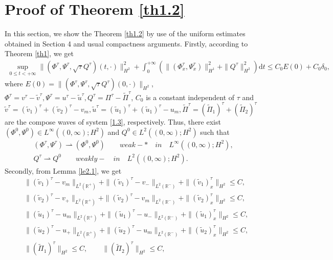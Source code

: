 \documentclass[10pt,reqno]{amsart}
\numberwithin{equation}{section}
\newcommand{\dif}{\mathrm{d}}
\begin{document}
\section{Proof of Theorem \ref{th1.2}}
In this section, we show the Theorem \ref{th1.2} by use of the uniform estimates obtained in Section 4 and usual compactness arguments.
Firstly,  according to Theorem \ref{th1}, we get
\begin{align*}
\sup_{0\le t<+\infty}\|(\Phi^{\tau}, \Psi^{\tau}, \sqrt{\tau}Q^{\tau}) (t,\cdot)\|_{H^2}^2+\int_0^{+\infty}\left(\|(\Phi^{\tau}_{x}, \Psi^{\tau}_{x})\|_{H^1}^2+\|Q^{\tau}\|_{H^2}^2\right)\dif t
\le C_0E(0)+C_0\delta_0,
\end{align*}
where $
E(0)=\|(\Phi^\tau,\Psi^\tau,\sqrt{\tau}Q^\tau)(0, \cdot)\|_{H^2}$, $\Phi^{\tau}=v^{\tau}-\widetilde v^{\tau}, \Psi^{\tau}=u^{\tau}-\widetilde u^{\tau}, Q^{\tau}=\Pi^{\tau}-\widetilde \Pi^{\tau}$, $C_0$ is a constant independent of $\tau$ and $\widetilde v^{\tau}=(\widetilde v_1)^{\tau}+(\widetilde v_2)^{\tau}-v_m, \widetilde u^{\tau}=(\widetilde u_1)^{\tau}+(\widetilde u_1)^{\tau}-u_m, \widetilde \Pi^{\tau}=(\widetilde \Pi_1)^{\tau}+(\widetilde \Pi_2)^{\tau}$ are the compose waves of system \eqref{1.3}, respectively. Thus, there exist $(\Phi^0, \Psi^0)\in L^{\infty}((0,\infty);H^2)$ and $Q^0\in L^2((0, \infty);H^2)$ such that
\begin{equation}\label{5.1}
\begin{aligned}
(\Phi^{\tau}, \Psi^{\tau})\rightharpoonup(\Phi^0, \Psi^0)\qquad weak-* \quad in \quad L^{\infty}((0,\infty);H^2),\\
Q^{\tau}\rightharpoonup Q^0 \qquad weakly- \quad in \quad  L^2((0, \infty);H^2).
\end{aligned}
\end{equation}
Secondly, from Lemma \ref{le2.1}, we get
\[
\begin{aligned}
&\|(\widetilde v_1)^{\tau}-v_m\|_{L^2(\mathbb{R}^+)}+\|(\widetilde v_1)^{\tau}-v_-\|_{L^2(\mathbb{R}^-)}
+\|(\widetilde v_1)^{\tau}_{x}\|_{H^2}\le C,\\
&\|(\widetilde v_2)^{\tau}-v_+\|_{L^2(\mathbb{R}^+)}+\|(\widetilde v_2)^{\tau}-v_m\|_{L^2(\mathbb{R}^-)}
+\|(\widetilde v_2)^{\tau}_{x}\|_{H^2}\le C,\\
&\|(\widetilde u_1)^{\tau}-u_m\|_{L^2(\mathbb{R}^+)}+\|(\widetilde u_1)^{\tau}-u_-\|_{L^2(\mathbb{R}^-)}
+\|(\widetilde u_1)^{\tau}_{x}\|_{H^2}\le C,\\
&\|(\widetilde u_2)^{\tau}-u_+\|_{L^2(\mathbb{R}^+)}+\|(\widetilde u_2)^{\tau}-u_m\|_{L^2(\mathbb{R}^-)}
+\|(\widetilde u_2)^{\tau}_{x}\|_{H^2}\le C,\\
&\|(\widetilde \Pi_1)^{\tau}\|_{H^2}\le C,\qquad \|(\widetilde \Pi_2)^{\tau}\|_{H^2}\le C,
\end{aligned}
\]
\end{document}
